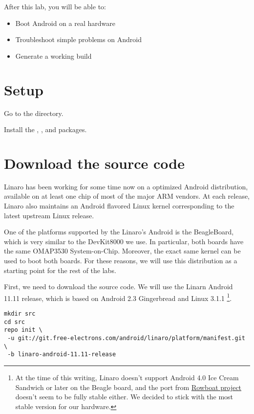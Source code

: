 
After this lab, you will be able to:
\begin{itemize}
  \item Boot Android on a real hardware
  \item Troubleshoot simple problems on Android
  \item Generate a working build
\end{itemize}

\section{Setup}

Go to the  directory.

Install the , , 
and  packages.

\section{Download the source code}

Linaro has been working for some time now on a optimized Android
distribution, available on at least one chip of most of the major ARM
vendors. At each release, Linaro also maintains an Android flavored
Linux kernel corresponding to the latest upstream Linux release.

One of the platforms supported by the Linaro's Android is the
BeagleBoard, which is very similar to the DevKit8000 we use. In
particular, both boards have the same OMAP3530 System-on-Chip.
Moreover, the exact same kernel can be used to boot both boards.
For these reasons, we will use this distribution as a
starting point for the rest of the labs.

First, we need to download the source code. We will use the Linarn
Android 11.11 release, which is based on Android 2.3 Gingerbread and
Linux 3.1.1
\footnote{At the time of this writing, Linaro doesn't support Android
  4.0 Ice Cream Sandwich or later on the Beagle board, and the port
  from \href{http://code.google.com/p/rowboat} {Rowboat project}
  doesn't seem to be fully stable either. We decided to stick with the
  most stable version for our hardware.}.

\begin{verbatim}
mkdir src
cd src
repo init \
 -u git://git.free-electrons.com/android/linaro/platform/manifest.git \
 -b linaro-android-11.11-release
\end{verbatim}

